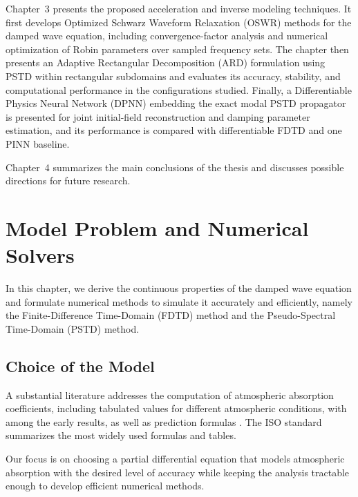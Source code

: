 \documentclass{Configuration_Files/PoliMi3i_thesis}
\newif\ifshowthesischanges
\DeclareRobustCommand{\thesischange}[2]{%
    \ifshowthesischanges
        \textcolor{#1}{#2}%
    \else
        #2%
    \fi
}
\def\thesischange#1#2{#2}%
\begin{document}
\thesischange{red}{Chapter~3 presents the proposed acceleration and inverse modeling techniques. It first develops Optimized Schwarz Waveform Relaxation (OSWR) methods for the damped wave equation, including convergence-factor analysis and numerical optimization of Robin parameters over sampled frequency sets. The chapter then presents an Adaptive Rectangular Decomposition (ARD) formulation using PSTD within rectangular subdomains and evaluates its accuracy, stability, and computational performance in the configurations studied. Finally, a Differentiable Physics Neural Network (DPNN) embedding the exact modal PSTD propagator is presented for joint initial-field reconstruction and damping parameter estimation, and its performance is compared with differentiable FDTD and one PINN baseline.}

Chapter~4 summarizes the main conclusions of the thesis and discusses possible directions for future research.



\setcounter{secnumdepth}{2}
\chapter{Model Problem and Numerical Solvers}
\label{ch:model_problem}

In this chapter, we derive the continuous properties of the damped wave equation and formulate numerical methods to simulate it accurately and efficiently, namely the Finite-Difference Time-Domain (FDTD) method and the Pseudo-Spectral Time-Domain (PSTD) method.

\section{Choice of the Model}

A substantial literature addresses the computation of atmospheric absorption coefficients, including tabulated values for different atmospheric conditions, with \cite{knudsen_absorption_1933} among the early results, as well as prediction formulas \citep{bass_atmospheric_1972,evans_atmospheric_1972}. The ISO standard \cite{iso_acoustics_1993} summarizes the most widely used formulas and tables.

Our focus is on choosing a partial differential equation that models atmospheric absorption with the desired level of accuracy while keeping the analysis tractable enough to develop efficient numerical methods.
\end{document}

